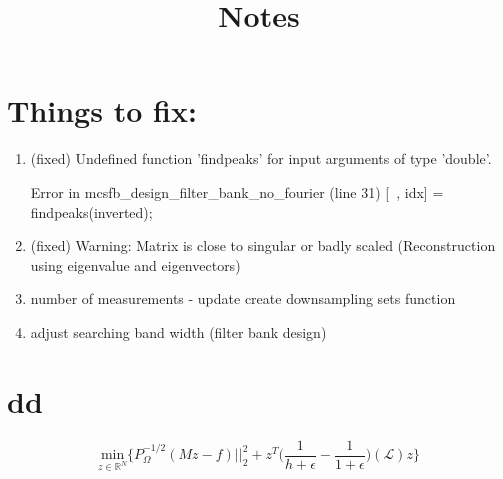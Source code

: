 \documentclass[a4paper]{article}
\title{Notes}
\newcommand{\RR}{\mathbb{R}}
\newcommand{\La}{\mathcal{L}}
\theoremstyle{definition}
\begin{document}
\maketitle

\newpage


\section{Things to fix:}
\begin{enumerate}
\item (fixed) Undefined function 'findpeaks' for input
arguments of type 'double'.

Error in mcsfb\_design\_filter\_bank\_no\_fourier
(line 31)
    [~, idx] = findpeaks(inverted); 
    
\item (fixed) Warning: Matrix is close to singular or badly scaled (Reconstruction using eigenvalue and eigenvectors)


\item number of measurements - update create downsampling sets function

\item adjust searching band width (filter bank design)

\end{enumerate}

\section{dd}

$$\underset{z \in \RR^N}{\text{min}} \{ P^{-1/2}_\Omega (Mz-f)\vert\vert_2^2 + z^T \bigg( \frac{1}{h+\epsilon}-\frac{1}{1+\epsilon} \bigg) (\La)z\}$$
\end{document}
